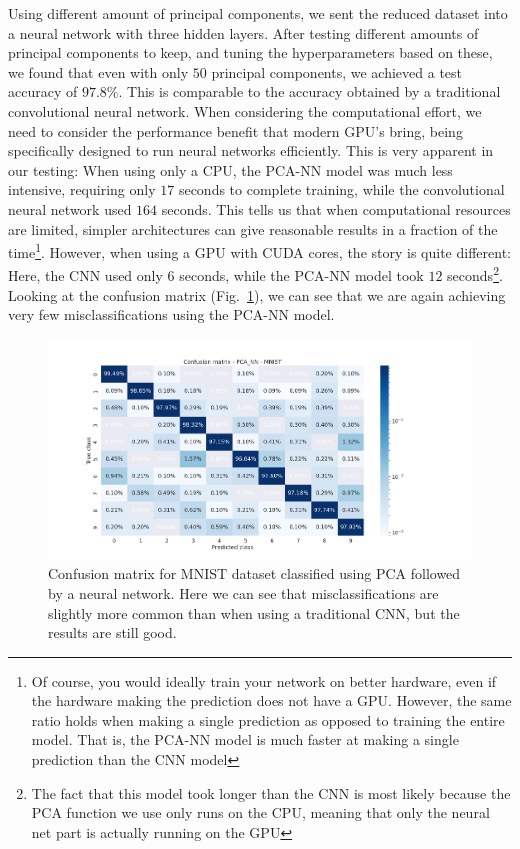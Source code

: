 \documentclass[onecolumn,10pt,cleanfoot]{asme2ej}
\begin{document}
Using different amount of principal components, we sent the reduced dataset into a neural network with three hidden layers. After testing different amounts of principal components to keep, and tuning the hyperparameters based on these, we found that even with only $50$ principal components, we achieved a test accuracy of $97.8\%$. This is comparable to the accuracy obtained by a traditional convolutional neural network. When considering the computational effort, we need to consider the performance benefit that modern GPU's bring, being specifically designed to run neural networks efficiently. This is very apparent in our testing: When using only a CPU, the PCA-NN model was much less intensive, requiring only $17$ seconds to complete training, while the convolutional neural network used $164$ seconds. This tells us that when computational resources are limited, simpler architectures can give reasonable results in a fraction of the time\footnote{Of course, you would ideally train your network on better hardware, even if the hardware making the prediction does not have a GPU. However, the same ratio holds when making a single prediction as opposed to training the entire model. That is, the PCA-NN model is much faster at making a single prediction than the CNN model}. However, when using a GPU with CUDA cores, the story is quite different: Here, the CNN used only $6$ seconds, while the PCA-NN model took $12$ seconds\footnote{The fact that this model took longer than the CNN is most likely because the PCA function we use only runs on the CPU, meaning that only the neural net part is actually running on the GPU}. Looking at the confusion matrix (Fig.~\ref{mnistheatmap_pcann}), we can see that we are again achieving very few misclassifications using the PCA-NN model.

\begin{figure}[H]
\centerline{\includegraphics[width=8in]{figure/conf_pca_nn_MNIST.png}}
\caption{Confusion matrix for MNIST dataset classified using PCA followed by a neural network. Here we can see that misclassifications are slightly more common than when using a traditional CNN, but the results are still good.}
\label{mnistheatmap_pcann}
\end{figure}
\end{document}
